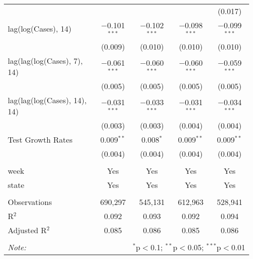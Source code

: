 \begin{tabular}{@{\extracolsep{1pt}}lcccc}
  &  &  &  & (0.017) \\ 
  lag(log(Cases), 14) & $-$0.101$^{***}$ & $-$0.102$^{***}$ & $-$0.098$^{***}$ & $-$0.099$^{***}$ \\ 
  & (0.009) & (0.010) & (0.010) & (0.010) \\ 
  lag(lag(log(Cases), 7), 14) & $-$0.061$^{***}$ & $-$0.060$^{***}$ & $-$0.060$^{***}$ & $-$0.059$^{***}$ \\ 
  & (0.005) & (0.005) & (0.005) & (0.005) \\ 
  lag(lag(log(Cases), 14), 14) & $-$0.031$^{***}$ & $-$0.033$^{***}$ & $-$0.031$^{***}$ & $-$0.034$^{***}$ \\ 
  & (0.003) & (0.003) & (0.004) & (0.004) \\ 
  Test Growth Rates & 0.009$^{**}$ & 0.008$^{*}$ & 0.009$^{**}$ & 0.009$^{**}$ \\ 
  & (0.004) & (0.004) & (0.004) & (0.004) \\ 
 \hline \\[-1.8ex] 
week & Yes & Yes & Yes & Yes \\ 
state & Yes & Yes & Yes & Yes \\ 
\hline \\[-1.8ex] 
Observations & 690,297 & 545,131 & 612,963 & 528,941 \\ 
R$^{2}$ & 0.092 & 0.093 & 0.092 & 0.094 \\ 
Adjusted R$^{2}$ & 0.085 & 0.086 & 0.085 & 0.086 \\ 
\hline 
\hline \\[-1.8ex] 
\textit{Note:}  & \multicolumn{4}{r}{$^{*}$p$<$0.1; $^{**}$p$<$0.05; $^{***}$p$<$0.01} \\ 
\end{tabular} 